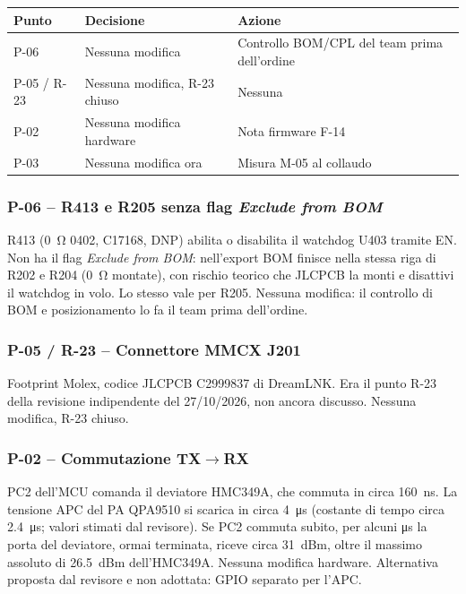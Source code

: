 {\small{}
\begin{tabularx}{\linewidth}{@{}lXX@{}}
\toprule
\textbf{Punto} & \textbf{Decisione} & \textbf{Azione}\\
\midrule
P-06 & Nessuna modifica & Controllo BOM/CPL del team prima dell'ordine\\
P-05 / R-23 & Nessuna modifica, R-23 chiuso & Nessuna\\
P-02 & Nessuna modifica hardware & Nota firmware F-14\\
P-03 & Nessuna modifica ora & Misura M-05 al collaudo\\
\bottomrule
\end{tabularx}}

\subsubsection{P-06 -- R413 e R205 senza flag \emph{Exclude from BOM}}
R413 (\SI{0}{\ohm} 0402, C17168, DNP) abilita o disabilita il watchdog U403 tramite EN. Non ha il flag \emph{Exclude from BOM}: nell'export BOM finisce nella stessa riga di R202 e R204 (\SI{0}{\ohm} montate), con rischio teorico che JLCPCB la monti e disattivi il watchdog in volo. Lo stesso vale per R205. Nessuna modifica: il controllo di BOM e posizionamento lo fa il team prima dell'ordine.

\subsubsection{P-05 / R-23 -- Connettore MMCX J201}
Footprint Molex, codice JLCPCB C2999837 di DreamLNK. Era il punto R-23 della revisione indipendente del 27/10/2026, non ancora discusso. Nessuna modifica, R-23 chiuso.

\subsubsection{P-02 -- Commutazione TX$\rightarrow$RX}
PC2 dell'MCU comanda il deviatore HMC349A, che commuta in circa \SI{160}{\nano\second}. La tensione APC del PA QPA9510 si scarica in circa \SI{4}{\micro\second} (costante di tempo circa \SI{2.4}{\micro\second}; valori stimati dal revisore). Se PC2 commuta subito, per alcuni \si{\micro\second} la porta del deviatore, ormai terminata, riceve circa \SI{+31}{dBm}, oltre il massimo assoluto di \SI{26.5}{dBm} dell'HMC349A. Nessuna modifica hardware. Alternativa proposta dal revisore e non adottata: GPIO separato per l'APC.

